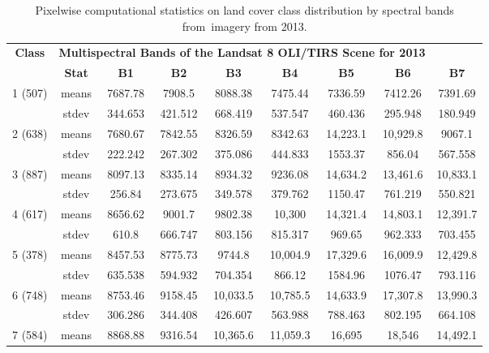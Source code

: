 \documentclass[jmse,article,accept,pdftex,oneauthor]{Definitions/mdpi}
\begin{document}
\begin{table}[H]
  \caption{Pixelwise computational statistics on land cover class distribution by spectral bands from~imagery from 2013.   \label{tab03}}%
    \vspace{-6pt}
\setlength{\tabcolsep}{1.73mm}
   \begin{tabular}{ccccccccc}
  \toprule
  \multirow{2}{*}{\textbf{Class}} & \multicolumn{7}{c}{\textbf{Multispectral Bands of the Landsat 8 OLI/TIRS Scene for 2013}} \\
    & \textbf{Stat} & \textbf{B1} & \textbf{B2} & \textbf{B3} & \textbf{B4} & \textbf{B5} & \textbf{B6} & \textbf{B7} \\
    \midrule
    \multirow{2}{*}{1 (507)} & means & 7687.78 & 7908.5 & 8088.38 & 7475.44 & 7336.59 & 7412.26 & 7391.69 \\
    & stdev & 344.653 & 421.512 & 668.419 & 537.547 & 460.436 & 295.948 & 180.949 \\
    \midrule
    \multirow{2}{*}{2 (638)} & means & 7680.67 & 7842.55 & 8326.59 & 8342.63 & 14,223.1 & 10,929.8 & 9067.1 \\
    & stdev & 222.242 & 267.302 & 375.086 & 444.833 & 1553.37 & 856.04 & 567.558 \\
    \midrule
    \multirow{2}{*}{3 (887)} & means & 8097.13 & 8335.14 & 8934.32 & 9236.08 & 14,634.2 & 13,461.6 & 10,833.1 \\
    & stdev & 256.84 & 273.675 & 349.578 & 379.762 & 1150.47 & 761.219 & 550.821 \\
    \midrule
    \multirow{2}{*}{4 (617)} & means & 8656.62 & 9001.7 & 9802.38 & 10,300 & 14,321.4 & 14,803.1 & 12,391.7 \\
    & stdev & 610.8 & 666.747 & 803.156 & 815.317 & 969.65 & 962.333 & 703.455 \\
    \midrule
    \multirow{2}{*}{5 (378)} & means & 8457.53 & 8775.73 & 9744.8 & 10,004.9 & 17,329.6 & 16,009.9 & 12,429.8 \\
    & stdev & 635.538 & 594.932 & 704.354 & 866.12 & 1584.96 & 1076.47 & 793.116 \\
    \midrule
    \multirow{2}{*}{6 (748)} & means & 8753.46 & 9158.45 & 10,033.5 & 10,785.5 & 14,633.9 & 17,307.8 & 13,990.3 \\
    & stdev & 306.286 & 344.408 & 426.607 & 563.988 & 788.463 & 802.195 & 664.108 \\
    \midrule
    \multirow{2}{*}{7 (584)} & means & 8868.88 & 9316.54 & 10,365.6 & 11,059.3 & 16,695 & 18,546 & 14,492.1 \\

\end{tabular}
\end{table}
\end{document}
